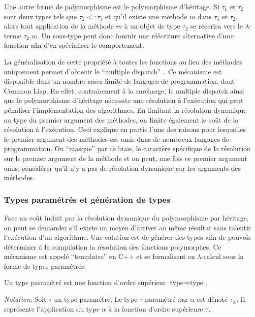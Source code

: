 Une autre forme de polymorphisme est le polymorphisme d'héritage. Si
$\tau_1$ et $\tau_2$ sont deux types tels que $\tau_2 <: \tau_1$ et
qu'il existe une méthode $m$ dans $\tau_1$ et $\tau_2$, alors tout
application de la méthode $m$ à un objet de type $\tau_2$ se réécrira
vers le $\lambda$-terme $\tau_2.m$. Un sous-type peut donc fournir une
réécriture alternative d'une fonction afin d'en spécialiser le
comportement.

La généralisation de cette propriété à toutes les fonctions au lieu
des méthodes uniquement permet d'obtenir le ``multiple
dispatch'' \citep{Muschevici2008}. Ce mécanisme est disponible dans un
nombre assez limité de langages de programmation, dont Common Lisp. En
effet, contrairement à la surcharge, le multiple dispatch ainsi que le
polymorphisme d'héritage nécessite une résolution à l'exécution qui
peut pénaliser l'implémentation des algorithmes. En limitant la
résolution dynamique au type du premier argument des méthodes, on
limite également le coût de la résolution à l'exécution. Ceci explique
en partie l'une des raisons pour lesquelles le premier argument des
méthodes est omis dans de nombreux langages de programmation. On
``masque'' par ce biais, le caractère spécifique de la résolution sur
le premier argument de la méthode et on peut, une fois ce premier
argument omis, considérer qu'il n'y a pas de résolution dynamique sur
les arguments des méthodes.


\subsubsection{Types paramétrés et génération de types}
\label{sec:chap1_model2impl_typage_param}

Face au coût induit par la résolution dynamique du polymorphisme par
héritage, on peut se demander s'il existe un moyen d'arriver au même
résultat sans ralentir l'exécution d'un algorithme. Une solution est
de générer des types afin de pouvoir déterminer à la compilation la
résolution des fonctions polymorphes. Ce mécanisme est appelé
``templates'' en C++ et se formalisent en $\lambda$-calcul sous la
forme de types paramétrés.


\begin{mydef}\label{chap1_parametrized_type}
  Un type paramétré est une fonction d'ordre supérieur $\text{type}
  \Rightarrow \text{type}$.

  \emph{Notation:} Soit $\tau$ un type paramétré. Le type $\tau$
  paramétré par $\alpha$ est dénoté $\tau_\alpha$. Il représente
  l'application du type $\alpha$ à la fonction d'ordre supérieure
  $\tau$.
\end{mydef}

